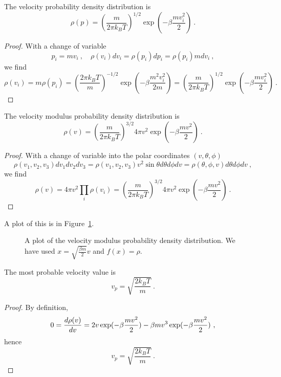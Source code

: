     The velocity probability density distribution is
    \begin{equation*}
        \rho(p) = (\frac{m}{2\pi k_B T})^{1/2} \exp(- \beta \frac{m v^2_i}{2}) ~.
    \end{equation*}
    \begin{proof}
        With a change of variable 
        \begin{equation*}
            p_i = m v_i ~, \quad \rho(v_i) dv_i = \rho(p_i) dp_i = \rho(p_i) m dv_i ~,
        \end{equation*}
        we find
        \begin{equation*}
            \rho(v_i) = m \rho (p_i) = (\frac{2\pi k_B T}{m})^{-1/2} \exp(- \beta \frac{m^2 v^2_i}{2m}) = (\frac{m}{2\pi k_B T})^{1/2} \exp(- \beta \frac{m v^2_i}{2}) ~.
        \end{equation*}
    \end{proof}

    The velocity modulus probability density distribution is 
    \begin{equation*}
        \rho (v) = (\frac{m}{2\pi k_B T})^{3/2} 4 \pi v^2 \exp(- \beta \frac{m v^2}{2}) ~.
    \end{equation*}
    \begin{proof}
        With a change of variable into the polar coordinates $(v, \theta, \phi)$
        \begin{equation*}
            \rho(v_1, v_2, v_3) dv_1 dv_2 dv_3 = \rho(v_1, v_2, v_3) v^2 \sin \theta d\theta d\phi dv = \rho(\theta, \phi, v) d\theta d\phi dv ~,
        \end{equation*}
        we find
        \begin{equation*}
            \rho(v) = 4 \pi v^2 \prod_i \rho (v_i) = (\frac{m}{2\pi k_B T})^{3/2} 4 \pi v^2 \exp(- \beta \frac{m v^2}{2})  ~.
        \end{equation*}
    \end{proof}
    A plot of this is in Figure~\ref{max:vel}.
    \begin{figure}[h!]
        \centering
        \caption{A plot of the velocity modulus probability density distribution. We have used $x = \sqrt{\frac{\beta m}{2}} v$ and $f(x) = \rho$.}
        \label{max:vel}
    \end{figure}

    The most probable velocity value is 
    \begin{equation*}
        v_p = \sqrt{\frac{2 k_B T}{m}} ~.
    \end{equation*}
    \begin{proof}
        By definition, 
        \begin{equation*}
            0 = \frac{d\rho(v)}{dv} = 2 v \exp(- \beta \frac{m v^2}{2}) - \beta m v^3 \exp(- \beta \frac{m v^2}{2}) ~,
        \end{equation*}
        hence 
        \begin{equation*}
            v_p = \sqrt{\frac{2k_B T}{m}} ~.
        \end{equation*}
    \end{proof}

